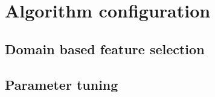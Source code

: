 \chapter{Algorithm configuration}
\section{Domain based feature selection}

\section{Parameter tuning}
